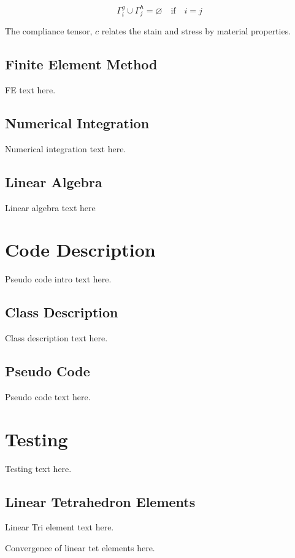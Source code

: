 \documentclass[a4paper, 12pt]{article}
\begin{document}
\begin{equation} \label{eq:DNconf}
\Gamma^{g}_{i} \cup \Gamma^{h}_{j} = \varnothing \quad \text{if} \quad i=j
\end{equation}

The compliance tensor, $c$ relates the stain and stress by
material properties.

\subsection{Finite Element Method} \label{subsec:fem}
FE text here.

\subsection{Numerical Integration} \label{subsec:numInt}
Numerical integration text here.

\subsection{Linear Algebra} \label{subsec:LinAlg}
Linear algebra text here

\section{Code Description} \label{sec:codeDes}
Pseudo code intro text here.

\subsection{Class Description} \label{subsec:class}
Class description text here.

\subsection{Pseudo Code} \label{subsec:pseudo}
Pseudo code text here.

\section{Testing} \label{sec:testing}
Testing text here.

\subsection{Linear Tetrahedron Elements} \label{subsec:linTet}
Linear Tri element text here.

Convergence of linear tet elements here.
\end{document}
